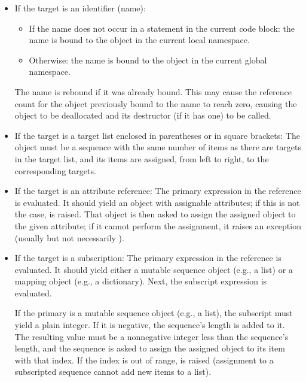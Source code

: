 \begin{itemize} %

\item
If the target is an identifier (name):

\begin{itemize}

\item
If the name does not occur in a  statement in the current
code block: the name is bound to the object in the current local
namespace.

\item
Otherwise: the name is bound to the object in the current global
namespace.

\end{itemize} %

The name is rebound if it was already bound.  This may cause the
reference count for the object previously bound to the name to reach
zero, causing the object to be deallocated and its
destructor (if it has one) to be called.

\item
If the target is a target list enclosed in parentheses or in square
brackets: The object must be a sequence with the same number of items
as there are targets in the target list, and its items are assigned,
from left to right, to the corresponding targets.

\item
If the target is an attribute reference: The primary expression in the
reference is evaluated.  It should yield an object with assignable
attributes; if this is not the case,  is raised.  That
object is then asked to assign the assigned object to the given
attribute; if it cannot perform the assignment, it raises an exception
(usually but not necessarily ).

\item
If the target is a subscription: The primary expression in the
reference is evaluated.  It should yield either a mutable sequence
object (e.g., a list) or a mapping object (e.g., a dictionary).  Next,
the subscript expression is evaluated.

If the primary is a mutable sequence object (e.g., a list), the subscript
must yield a plain integer.  If it is negative, the sequence's length
is added to it.  The resulting value must be a nonnegative integer
less than the sequence's length, and the sequence is asked to assign
the assigned object to its item with that index.  If the index is out
of range,  is raised (assignment to a subscripted
sequence cannot add new items to a list).


\end{itemize}
